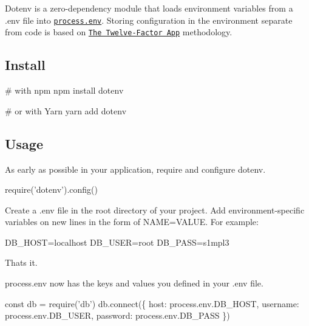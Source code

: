 

Dotenv is a zero-\/dependency module that loads environment variables from a {\ttfamily .env} file into \href{https://nodejs.org/docs/latest/api/process.html#process_process_env}{\tt {\ttfamily process.\+env}}. Storing configuration in the environment separate from code is based on \href{http://12factor.net/config}{\tt The Twelve-\/\+Factor App} methodology.

\href{https://travis-ci.org/motdotla/dotenv}{\tt } \href{https://ci.appveyor.com/project/motdotla/dotenv/branch/master}{\tt } \href{https://www.npmjs.com/package/dotenv}{\tt } \href{https://github.com/feross/standard}{\tt } \href{https://coveralls.io/github/motdotla/dotenv?branch=coverall-intergration}{\tt }

\subsection*{Install}


\begin{DoxyCode}
# with npm
npm install dotenv

# or with Yarn
yarn add dotenv
\end{DoxyCode}


\subsection*{Usage}

As early as possible in your application, require and configure dotenv.


\begin{DoxyCode}
require('dotenv').config()
\end{DoxyCode}


Create a {\ttfamily .env} file in the root directory of your project. Add environment-\/specific variables on new lines in the form of {\ttfamily N\+A\+ME=V\+A\+L\+UE}. For example\+:


\begin{DoxyCode}
DB\_HOST=localhost
DB\_USER=root
DB\_PASS=s1mpl3
\end{DoxyCode}


That\textquotesingle{}s it.

{\ttfamily process.\+env} now has the keys and values you defined in your {\ttfamily .env} file.


\begin{DoxyCode}
const db = require('db')
db.connect(\{
  host: process.env.DB\_HOST,
  username: process.env.DB\_USER,
  password: process.env.DB\_PASS
\})
\end{DoxyCode}


